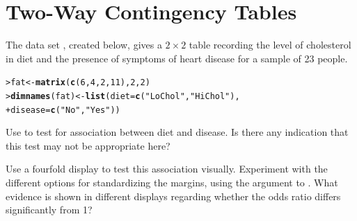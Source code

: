 \documentclass[10pt]{report}\usepackage[]{graphicx}\usepackage[]{color}
\makeatletter
\newcommand{\hlnum}[1]{\textcolor[rgb]{0.686,0.059,0.569}{#1}}%
\newcommand{\hlstr}[1]{\textcolor[rgb]{0.192,0.494,0.8}{#1}}%
\newcommand{\hlstd}[1]{\textcolor[rgb]{0.345,0.345,0.345}{#1}}%
\newcommand{\hlkwb}[1]{\textcolor[rgb]{0.69,0.353,0.396}{#1}}%
\newcommand{\hlkwc}[1]{\textcolor[rgb]{0.333,0.667,0.333}{#1}}%
\newcommand{\hlkwd}[1]{\textcolor[rgb]{0.737,0.353,0.396}{\textbf{#1}}}%
\newenvironment{kframe}{%
 \def\at@end@of@kframe{}%
 \ifinner\ifhmode%
  \def\at@end@of@kframe{\end{minipage}}%
  \begin{minipage}{\columnwidth}%
 \fi\fi%
 \def\FrameCommand##1{\hskip\@totalleftmargin \hskip-\fboxsep
 \colorbox{shadecolor}{##1}\hskip-\fboxsep
     \hskip-\linewidth \hskip-\@totalleftmargin \hskip\columnwidth}%
 \MakeFramed {\advance\hsize-\width
   \@totalleftmargin\z@ \linewidth\hsize
   \@setminipage}}%
 {\par\unskip\endMakeFramed%
 \at@end@of@kframe}
\newenvironment{knitrout}{}{} %
\renewenvironment{knitrout}{\small\renewcommand{\baselinestretch}{.85}}{} %
\makeatother
\begin{document}
\clearpage
\chapter{Two-Way Contingency Tables}\label{ch:twoway}


\begin{Exercises}

  \exercise The data set , created below, gives a $2 \times 2$ table recording the level of
  cholesterol in diet and the presence of symptoms of heart disease for a sample of
  23 people.

\begin{knitrout}\footnotesize
{}\color{fgcolor}\begin{kframe}
\begin{alltt}
\hlstd{> }\hlstd{fat} \hlkwb{<-} \hlkwd{matrix}\hlstd{(}\hlkwd{c}\hlstd{(}\hlnum{6}\hlstd{,} \hlnum{4}\hlstd{,} \hlnum{2}\hlstd{,} \hlnum{11}\hlstd{),} \hlnum{2}\hlstd{,} \hlnum{2}\hlstd{)}
\hlstd{> }\hlkwd{dimnames}\hlstd{(fat)} \hlkwb{<-} \hlkwd{list}\hlstd{(}\hlkwc{diet} \hlstd{=} \hlkwd{c}\hlstd{(}\hlstr{"LoChol"}\hlstd{,} \hlstr{"HiChol"}\hlstd{),}
\hlstd{+ }                      \hlkwc{disease} \hlstd{=} \hlkwd{c}\hlstd{(}\hlstr{"No"}\hlstd{,} \hlstr{"Yes"}\hlstd{))}
\end{alltt}
\end{kframe}
\end{knitrout}

  \begin{enumerate*}
    \item Use  to test for association between diet and disease.
    Is there any indication that this test may not be appropriate here?
    \begin{ans}
    \end{ans}
    
    
    \item Use a fourfold display to test this association visually.  Experiment with    
    the different options for standardizing the margins, using the 
    argument to . What evidence is shown in different displays regarding
    whether the odds ratio differs significantly from 1?
    \begin{ans}
    \end{ans}
    

\end{enumerate*}
\end{Exercises}
\end{document}
